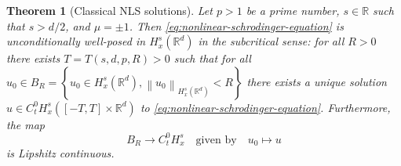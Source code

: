 \documentclass{article}
\newtheorem{theorem}{Theorem}
\def\R{\mathbb{R}} %
\newcommand\norm[1]{\left\lVert#1\right\rVert}
\begin{document}
\begin{theorem}[Classical NLS solutions]
  \label{thm:classical-nls-solutions}
  Let $p>1$ be a prime number, $s\in \R$ such that $s>d/2$, and $\mu=\pm 1$.
  Then \cref{eq:nonlinear-schrodinger-equation} is unconditionally well-posed in $H_{x}^{s}(\R^d)$ in the
  subcritical sense: for all $R>0$ there exists $T=T(s,d,p,R)>0$ such that
  for all $u_{0}\in B_{R}=\left\{u_{0}\in H_{x}^{s}(\R^d),
    \norm{u_{0}}_{H_{x}^{s}(\R^d)}<R\right\}$ there exists a unique solution
  $u\in C_{t}^{0}H_{x}^{s}\left( \left[ -T,T \right]\times \R^d  \right)$ to
  \cref{eq:nonlinear-schrodinger-equation}. Furthermore, the map
  \begin{equation*}
    B_{R}\to C_{t}^{0}H_{x}^{s} \quad \text{given by}\quad u_{0}\mapsto u
  \end{equation*}
  is Lipshitz continuous.
\end{theorem}
\end{document}
